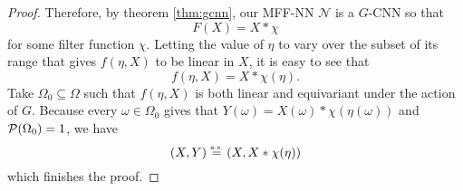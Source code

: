 \documentclass[10pt]{article}
\begin{document}
\begin{proof}
Therefore, by theorem \ref{thm:gcnn}, our MFF-NN $\mathcal{N}$ is a $G$-CNN so that
$$
	F(X) = X * \chi
$$
for some filter function $\chi$.
Letting the value of $\eta$ to vary over the subset of its range that gives $f(\eta,X)$ to be linear in $X$, it is easy to see that
$$
	f(\eta,X) = X * \chi(\eta).
$$
Take $\Omega_0 \subseteq \Omega$ such that $f(\eta,X)$ is both linear and equivariant under the action of $G$.
Because every $\omega \in \Omega_0$ gives that $Y(\omega) = X(\omega) * \chi(\eta(\omega))$ and $\P(\Omega_0) = 1$, we have
$$
	(X,Y) \equas (X,X * \chi(\eta))
$$
which finishes the proof.
\end{proof}



\clearpage
\appendix





\printbibliography
\end{document}
